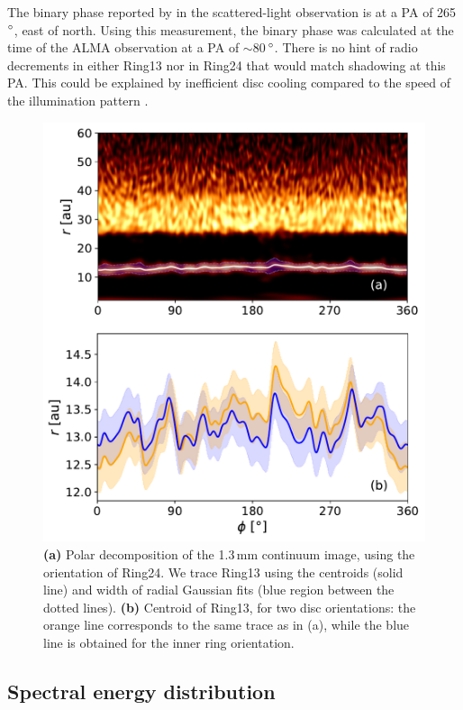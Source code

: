 \documentclass[fleqn,usenatbib,useAMS]{mnras}
\begin{document}
The binary phase reported by \citet{dOrazi} in the scattered-light observation is at a PA of 265\,$\hbox{$^\circ$}$, east of north. Using this measurement, the binary phase was calculated at the time of the ALMA observation at a PA of $\sim$80\,$\hbox{$^\circ$}$. There is no hint of radio decrements in either Ring13 nor in Ring24 that would match shadowing at this PA. This could be explained by inefficient disc cooling compared to the speed of the illumination pattern \citep[see ][ for estimates of this cooling timescale]{Casassus2019MNRAS.486L..58C}.

\begin{figure}
    \includegraphics[width=\columnwidth]{polar_ring_aprox_and_diff_inner.pdf}
    \caption{{\bf (a)} Polar decomposition of the 1.3\,mm continuum image, using the orientation of Ring24. We trace Ring13 using the centroids (solid line) and width of radial Gaussian fits (blue region between the dotted lines). {\bf (b)} Centroid of Ring13, for two disc orientations: the orange line corresponds to the same trace as in (a), while the blue line is obtained for the inner ring orientation.}
    \label{fig:polarring}
\end{figure}

\subsection{Spectral energy distribution} \label{subsec:SED}
\end{document}
